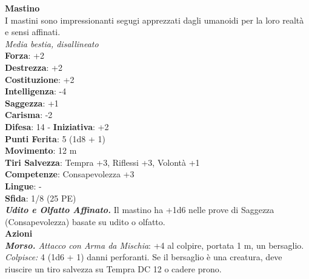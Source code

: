 \begin{multicols}{2}
\medskip\textbf{Mastino}\\
I mastini sono impressionanti segugi apprezzati dagli umanoidi per la loro realtà e sensi affinati.\\
\emph{Media bestia, disallineato}\\
\textbf{Forza}: +2\\
\textbf{Destrezza}: +2\\
\textbf{Costituzione}: +2\\
\textbf{Intelligenza}: -4\\
\textbf{Saggezza}: +1\\
\textbf{Carisma}: -2\\
\textbf{Difesa}: 14 - \textbf{Iniziativa}: +2\\
\textbf{Punti Ferita}: 5 (1d8 + 1)\\
\textbf{Movimento}: 12 m\\
\textbf{Tiri Salvezza}: Tempra +3, Riflessi +3, Volontà +1 \\
\textbf{Competenze}: Consapevolezza +3\\
\textbf{Lingue}: -\\
\textbf{Sfida}: 1/8 (25 PE)\smallskip\\
\emph{\textbf{Udito e Olfatto Affinato.}} Il mastino ha +1d6 nelle prove di Saggezza (Consapevolezza) basate su udito o olfatto.\\
\smallskip\textbf{Azioni}\\
\emph{\textbf{Morso.} Attacco con Arma da Mischia}: +4 al colpire, portata 1 m, un bersaglio.\\
\emph{Colpisce:} 4 (1d6 + 1) danni perforanti. Se il bersaglio è una creatura, deve riuscire un tiro salvezza su Tempra DC  12 o cadere prono.\\


\end{multicols}
